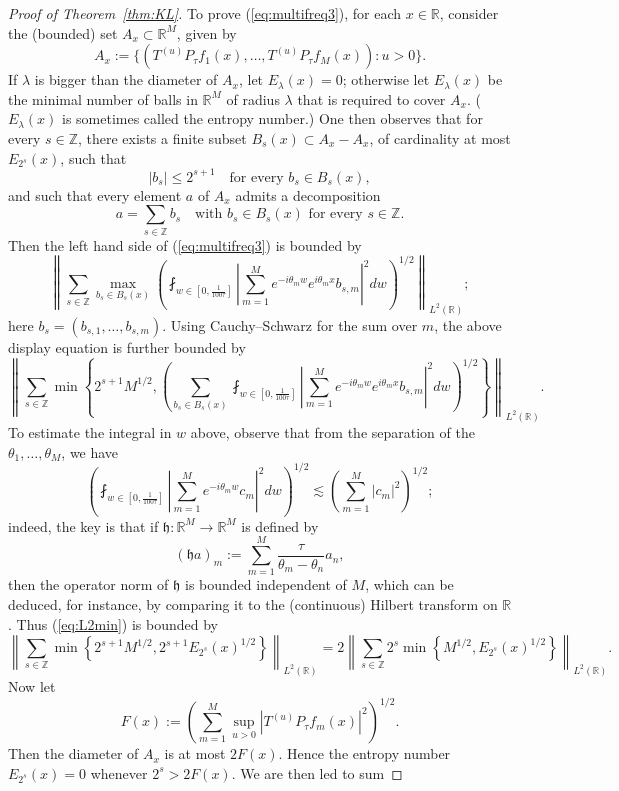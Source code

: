 \documentclass[12pt,leqno]{amsart}
\def\R{\mathbb{R}}
\def\Z{\mathbb{Z}}
\def\beq{\begin{equation}}
\def\endeq{\end{equation}}
\theoremstyle{plain}
\numberwithin{equation}{section}
\begin{document}
\begin{proof}[Proof of Theorem~\ref{thm:KL}]
To prove (\ref{eq:multifreq3}), for each $x \in \R$, consider the (bounded) set $A_x \subset \R^M$, given by
$$
A_x := \{(T^{(u)} P_{\tau} f_1(x), \dots, T^{(u)} P_{\tau} f_M(x)) \colon u > 0\}.
$$ 
If $\lambda$ is bigger than the diameter of $A_x$, let $E_{\lambda}(x) = 0$; otherwise let $E_{\lambda}(x)$ be the minimal number of balls in $\R^M$ of radius $\lambda$ that is required to cover $A_x$. ($E_{\lambda}(x)$ is sometimes called the entropy number.) One then observes that for every $s \in \Z$, there exists a finite subset $B_s(x) \subset A_x - A_x$, of cardinality at most $E_{2^s}(x)$, such that
$$
|b_s| \leq 2^{s+1} \quad \text{for every $b_s \in B_s(x)$},
$$
and such that every element $a$ of $A_x$ admits a decomposition
$$
a = \sum_{s \in \Z} b_s \quad \text{with $b_s \in B_s(x)$ for every $s \in \Z$}.
$$
Then the left hand side of (\ref{eq:multifreq3}) is bounded by
\[
\left \| \sum_{s \in \Z} \max_{b_s \in B_s(x)} \left ( \fint_{w \in [0,\frac{1}{100\tau}]} \left | \sum_{m=1}^M e^{-i\theta_m w} e^{i\theta_m x} b_{s,m} \right |^2 dw \right)^{1/2} \right \|_{L^2(\R)};
\]
here $b_s = (b_{s,1}, \dots, b_{s,m})$. Using Cauchy--Schwarz for the sum over $m$, the above display equation is further bounded by
\beq \label{eq:L2min}
\left \| \sum_{s \in \Z} \min \left \{ 2^{s+1} M^{1/2}, \left ( \sum_{b_s \in B_s(x)} \fint_{w \in [0,\frac{1}{100\tau}]} \left | \sum_{m=1}^M e^{-i\theta_m w} e^{i\theta_m x} b_{s,m} \right |^2 dw \right)^{1/2} \right \} \right \|_{L^2(\R)}.
\endeq
To estimate the integral in $w$ above, observe that from the separation of the $\theta_1, \dots, \theta_M$, we have
$$
\left( \fint_{w \in [0,\frac{1}{100\tau}]} \left| \sum_{m=1}^M e^{-i\theta_m w} c_m \right|^2 dw \right)^{1/2} \lesssim \left( \sum_{m=1}^M |c_m|^2 \right)^{1/2};
$$
indeed, the key is that if $\mathfrak{h} \colon \R^M \to \R^M$ is defined by
$$
(\mathfrak{h}a)_m := \sum_{m=1}^M \frac{\tau}{\theta_m - \theta_n} a_n,
$$
then the operator norm of $\mathfrak{h}$ is bounded independent of $M$, which can be deduced, for instance, by comparing it to the (continuous) Hilbert transform on $\R$. Thus (\ref{eq:L2min}) is bounded by
\beq \label{eq:BourgainLemma3.33}
\left \| \sum_{s \in \Z} \min \left \{ 2^{s+1} M^{1/2}, 2^{s+1} E_{2^s}(x)^{1/2} \right \} \right \|_{L^2(\R)}
= 2 \left \| \sum_{s \in \Z} 2^s \min \left \{ M^{1/2}, E_{2^s}(x)^{1/2} \right \} \right \|_{L^2(\R)}.
\endeq
Now let $$F(x) := \left( \sum_{m=1}^M \sup_{u > 0} |T^{(u)} P_{\tau} f_m(x)|^2 \right)^{1/2}.$$ Then the diameter of $A_x$ is at most $2 F(x)$. Hence the entropy number $E_{2^s}(x) = 0$ whenever $2^s > 2 F(x)$. We are then led to sum

\end{proof}
\end{document}
